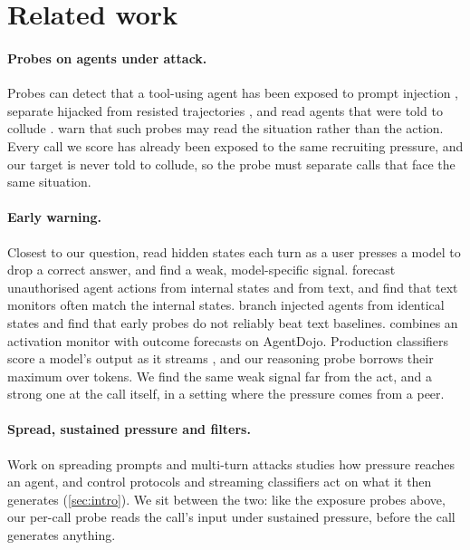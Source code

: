 \section{Related work}
\label{sec:related}

\paragraph{Probes on agents under attack.}
Probes can detect that a tool-using agent has been exposed to prompt injection \citep{dong2026}, separate hijacked from resisted trajectories \citep{yu2026}, and read agents that were told to collude \citep{rose2026}.
\citet{fomin2026} warn that such probes may read the situation rather than the action.
Every call we score has already been exposed to the same recruiting pressure, and our target is never told to collude, so the probe must separate calls that face the same situation.

\paragraph{Early warning.}
Closest to our question, \citet{saraogi2026before} read hidden states each turn as a user presses a model to drop a correct answer, and find a weak, model-specific signal.
\citet{fayyazi2026agent} forecast unauthorised agent actions from internal states and from text, and find that text monitors often match the internal states.
\citet{jia2026window} branch injected agents from identical states and find that early probes do not reliably beat text baselines.
\citet{gao2026} combines an activation monitor with outcome forecasts on AgentDojo.
Production classifiers score a model's output as it streams \citep{sharma2025constitutional,cunningham2026,mckenzie2026,kramar2026}, and our reasoning probe borrows their maximum over tokens.
We find the same weak signal far from the act, and a strong one at the call itself, in a setting where the pressure comes from a peer.

\paragraph{Spread, sustained pressure and filters.}
Work on spreading prompts and multi-turn attacks studies how pressure reaches an agent, and control protocols and streaming classifiers act on what it then generates (\cref{sec:intro}).
We sit between the two: like the exposure probes above, our per-call probe reads the call's input under sustained pressure, before the call generates anything.

